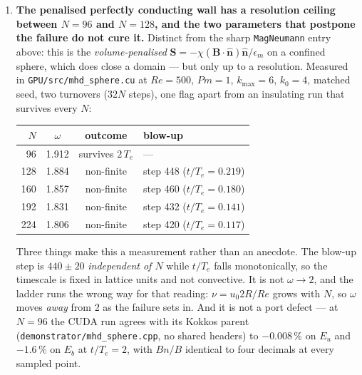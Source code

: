 \documentclass[11pt,a4paper]{article}
\newcommand{\code}[1]{\texttt{\small #1}}
\begin{document}
\begin{enumerate}[leftmargin=1.4em,itemsep=4pt]
\item \textbf{The penalised perfectly conducting wall has a resolution ceiling
  between $N=96$ and $N=128$, and the two parameters that postpone the failure
  do not cure it.} Distinct from the sharp \code{MagNeumann} entry above: this
  is the \emph{volume-penalised} $\bm{S}=-\chi(\bm{B}\!\cdot\!\hat{\bm{n}})
  \hat{\bm{n}}/\epsilon_m$ on a confined sphere, which does close a domain ---
  but only up to a resolution. Measured in \code{GPU/src/mhd\_sphere.cu} at
  $Re=500$, $Pm=1$, $k_{\max}=6$, $k_0=4$, matched seed, two turnovers
  ($32N$ steps), one flag apart from an insulating run that survives every $N$:

  \begin{center}\small
  \begin{tabular}{rccl}
  \hline
  $N$ & $\omega$ & outcome & blow-up \\
  \hline
  96  & 1.912 & survives $2\,T_e$ & --- \\
  128 & 1.884 & non-finite & step 448 ($t/T_e=0.219$) \\
  160 & 1.857 & non-finite & step 460 ($t/T_e=0.180$) \\
  192 & 1.831 & non-finite & step 432 ($t/T_e=0.141$) \\
  224 & 1.806 & non-finite & step 420 ($t/T_e=0.117$) \\
  \hline
  \end{tabular}
  \end{center}

  Three things make this a measurement rather than an anecdote. The blow-up
  step is $440\pm20$ \emph{independent of $N$} while $t/T_e$ falls monotonically,
  so the timescale is fixed in lattice units and not convective. It is not
  $\omega\to2$, and the ladder runs the wrong way for that reading: $\nu=u_0
  2R/Re$ grows with $N$, so $\omega$ moves \emph{away} from 2 as the failure
  sets in. And it is not a port defect --- at $N=96$ the CUDA run agrees with
  its Kokkos parent (\code{demonstrator/mhd\_sphere.cpp}, no shared headers) to
  $-0.008\,\%$ on $E_u$ and $-1.6\,\%$ on $E_b$ at $t/T_e=2$, with $Bn/B$
  identical to four decimals at every sampled point.


\end{enumerate}
\end{document}
